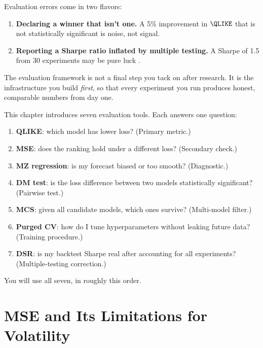 \begin{warning}
Evaluation errors come in two flavors:
\begin{enumerate}[nosep]
  \item \textbf{Declaring a winner that isn't one.} A 5\% improvement in $\QLIKE$ that is not statistically significant is noise, not signal.
  \item \textbf{Reporting a Sharpe ratio inflated by multiple testing.} A Sharpe of 1.5 from 30 experiments may be pure luck \citep{Bailey2014DSR}.
\end{enumerate}
\end{warning}

The evaluation framework is not a final step you tack on after research.
It is the infrastructure you build \emph{first}, so that every experiment you run produces honest, comparable numbers from day one.

\begin{keyidea}
This chapter introduces seven evaluation tools.
Each answers one question:
\begin{enumerate}[nosep]
  \item \textbf{QLIKE}: which model has lower loss? (Primary metric.)
  \item \textbf{MSE}: does the ranking hold under a different loss? (Secondary check.)
  \item \textbf{MZ regression}: is my forecast biased or too smooth? (Diagnostic.)
  \item \textbf{DM test}: is the loss difference between two models statistically significant? (Pairwise test.)
  \item \textbf{MCS}: given all candidate models, which ones survive? (Multi-model filter.)
  \item \textbf{Purged CV}: how do I tune hyperparameters without leaking future data? (Training procedure.)
  \item \textbf{DSR}: is my backtest Sharpe real after accounting for all experiments? (Multiple-testing correction.)
\end{enumerate}
You will use all seven, in roughly this order.
\end{keyidea}

\section{MSE and Its Limitations for Volatility}
\label{sec:eval-mse}

